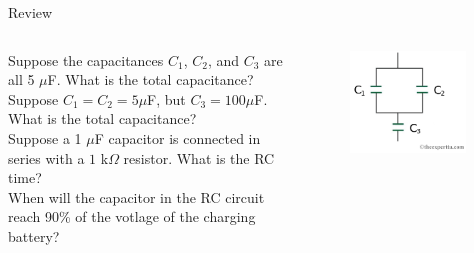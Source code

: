 \documentclass{beamer}
\begin{document}
\begin{frame}{Review}
\begin{columns}[T]
\begin{column}{0.5\textwidth}
\small
Suppose the capacitances $C_1$, $C_2$, and $C_3$ are all 5 $\mu$F.  What is the total capacitance? \\ \vspace{0.5cm}
Suppose $C_1 = C_2 = 5 \mu$F, but $C_3 = 100 \mu$F.  What is the total capacitance? \\ \vspace{0.5cm}
Suppose a 1 $\mu$F capacitor is connected in series with a $1$ k$\Omega$ resistor.  What is the RC time? \\ \vspace{0.5cm}
When will the capacitor in the RC circuit reach 90\% of the votlage of the charging battery?
\end{column}
\begin{column}{0.5\textwidth}
\begin{figure}
\centering
\includegraphics[width=0.95\textwidth]{ex3.png}
\caption{\label{fig:ex3}}
\end{figure}
\end{column}
\end{columns}
\end{frame}
\end{document}
